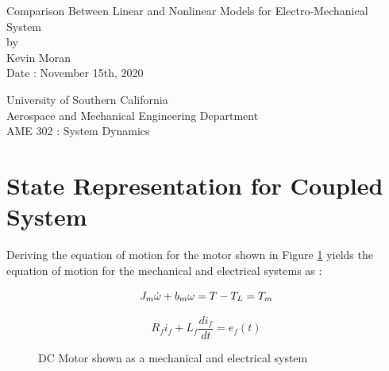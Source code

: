 \documentclass[letterpaper,12pt]{article}
\begin{document}
\begin{titlepage}
 \begin{center}
 \vspace*{1in}
{\Huge Comparison Between Linear and Nonlinear Models for Electro-Mechanical System}\\
    \bigskip
    by\\
    \bigskip
    {\Large Kevin Moran} \\
    \bigskip
    Date : November 15th, 2020

    \bigskip\bigskip\bigskip
    University of Southern California\\
    Aerospace and Mechanical Engineering Department\\
    AME 302 : System Dynamics
 \end{center}
\end{titlepage}


\section{State Representation for Coupled System}
Deriving the equation of motion for the motor shown in Figure \ref{motor} yields the equation of motion for the mechanical and electrical systems as :  

\begin{equation}
    J_m\dot{\omega} + b_m\omega = T - T_L= T_m\\
    \label{mechEOM}
\end{equation}

\begin{equation}
    R_fi_f + L_f\frac{di_f}{dt}=e_{f}(t)
    \label{elecEOM}
\end{equation}
    
\begin{figure}[h]
    \centering
    \quad
    \label{motor}
    \caption{DC Motor shown as a mechanical and electrical system}
\end{figure}
\end{document}
